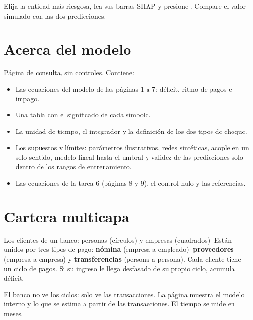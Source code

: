 \begin{pruebe}
Elija la entidad más riesgosa, lea sus barras SHAP y presione . Compare el valor simulado con las dos predicciones.
\end{pruebe}

\section{Acerca del modelo}


Página de consulta, sin controles. Contiene:

\begin{itemize}
\item Las ecuaciones del modelo de las páginas 1 a 7: déficit, ritmo de pagos e impago.
\item Una tabla con el significado de cada símbolo.
\item La unidad de tiempo, el integrador y la definición de los dos tipos de choque.
\item Los supuestos y límites: parámetros ilustrativos, redes sintéticas, acople en un
solo sentido, modelo lineal hasta el umbral y validez de las predicciones solo dentro de
los rangos de entrenamiento.
\item Las ecuaciones de la tarea 6 (páginas 8 y 9), el control nulo y las referencias.
\end{itemize}

\section{Cartera multicapa}


\begin{representa}
Los clientes de un banco: personas (círculos) y empresas (cuadrados). Están unidos por
tres tipos de pago: \textbf{nómina} (empresa a empleado), \textbf{proveedores} (empresa a
empresa) y \textbf{transferencias} (persona a persona). Cada cliente tiene un ciclo de
pagos. Si su ingreso le llega desfasado de su propio ciclo, acumula déficit.

El banco no ve los ciclos: solo ve las transacciones. La página muestra el modelo
interno y lo que se estima a partir de las transacciones. El tiempo se mide en meses.
\end{representa}

